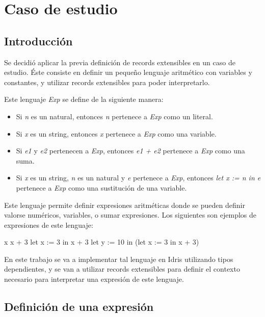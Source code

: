 
\chapter{Caso de estudio}
\label{ch:4}

\section{Introducción}

Se decidió aplicar la previa definición de records extensibles en un caso de estudio. Éste consiste en definir un pequeño lenguaje aritmético con variables y constantes, y utilizar records extensibles para poder interpretarlo.

Este lenguaje \textit{Exp} se define de la siguiente manera:
\begin{itemize}
\item Si \textit{n} es un natural, entonces \textit{n} pertenece a \textit{Exp} como un literal.
\item Si \textit{x} es un string, entonces \textit{x} pertenece a \textit{Exp} como una variable.
\item Si \textit{e1} y \textit{e2} pertenecen a \textit{Exp}, entonces \textit{e1 + e2} pertenece a \textit{Exp} como una suma.
\item Si \textit{x} es un string, \textit{n} es un natural y \textit{e} pertenece a \textit{Exp}, entonces \textit{let x := n in e} pertenece a \textit{Exp} como una sustitución de una variable.
\end{itemize}

Este lenguaje permite definir expresiones aritméticas donde se pueden definir valorse numéricos, variables, o sumar expresiones. Los siguientes son ejemplos de expresiones de este lenguaje:

\begin{code}
x
x + 3
let x := 3 in x + 3
let y := 10 in (let x := 3 in x + 3)
\end{code}

En este trabajo se va a implementar tal lenguaje en Idris utilizando tipos dependientes, y se van a utilizar records extensibles para definir el contexto necesario para interpretar una expresión de este lenguaje.

\section{Definición de una expresión}

